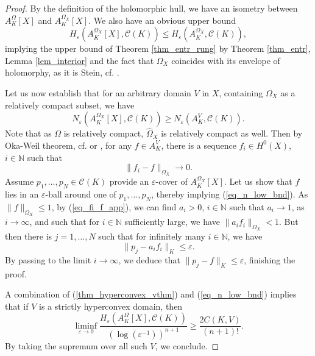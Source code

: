 \documentclass[12pt]{article}
\numberwithin{equation}{section}
\theoremstyle{theorem}
\theoremstyle{definition}
\theoremstyle{remark}
\newcommand{\nat}{\mathbb{N}}
\begin{document}
	\begin{proof}
		By the definition of the holomorphic hull, we have an isometry between $A_K^{\Omega}[X]$ and $A_K^{\Omega_X}[X]$.
		We also have an obvious upper bound
		\begin{equation}
			H_{\varepsilon}(A_K^{\Omega_X}[X], \mathscr{C}(K))
			\leq
			H_{\varepsilon}(A_K^{\Omega_X}, \mathscr{C}(K)),
		\end{equation}
		implying the upper bound of Theorem \ref{thm_entr_rung} by Theorem \ref{thm_entr}, Lemma \ref{lem_interior} and the fact that $\Omega_X$ coincides with its envelope of holomorphy, as it is Stein, cf. \cite[Theorem 5.4.2]{Hormander}.
		\par 
		Let us now establish that for an arbitrary domain $V$ in $X$, containing $\Omega_X$ as a relatively compact subset, we have
		\begin{equation}\label{eq_n_low_bnd}
			N_{\varepsilon}(A_K^{\Omega_X}[X], \mathscr{C}(K))
			\geq
			N_{\varepsilon}(A_K^{V}, \mathscr{C}(K)).
		\end{equation}
		Note that as $\Omega$ is relatively compact, $\widehat{\Omega}_X$ is relatively compact as well.
		Then by Oka-Weil theorem, cf. \cite[Theorem 18]{FornaessMergel} or \cite[Corollary 5.2.9]{Hormander}, for any $f \in A_K^{V}$, there is a sequence $f_i \in H^0(X)$, $i \in \nat$ such that 
		\begin{equation}\label{eq_fi_f_app}
			\| f_i - f \|_{\Omega_X} \to 0.
		\end{equation}
		Assume $p_1, \ldots, p_N \in \mathscr{C}(K)$ provide an $\varepsilon$-cover of $A_K^{\Omega_X}[X]$.
		Let us show that $f$ lies in an $\varepsilon$-ball around one of $p_1, \ldots, p_N$, thereby implying (\ref{eq_n_low_bnd}).
		As $\| f \|_{\Omega_X} \leq 1$, by (\ref{eq_fi_f_app}), we can find $a_i > 0$, $i \in \nat$ such that $a_i \to 1$, as $i \to \infty$, and such that for $i \in \nat$ sufficiently large, we have $\| a_i f_i \|_{\Omega_X} < 1$.
		But then there is $j = 1, \ldots, N$ such that for infinitely many $i \in \nat$, we have
		\begin{equation}
			\| p_j - a_i f_i \|_K \leq \varepsilon.
		\end{equation}
		By passing to the limit $i \to \infty$, we deduce that $\| p_j - f \|_K \leq \varepsilon$, finishing the proof.
		\par 
		A combination of (\ref{thm_hyperconvex_vthm}) and (\ref{eq_n_low_bnd}) implies that if $V$ is a strictly hyperconvex domain, then
		\begin{equation}
			\liminf_{\varepsilon \to 0}
			\frac{H_{\varepsilon}(A_K^{\Omega}[X], \mathscr{C}(K))}{(\log(\varepsilon^{-1}))^{n + 1}}
			\geq
			\frac{2 C(K, V)}{(n + 1)!}.
		\end{equation}
		By taking the supremum over all such $V$, we conclude.
	\end{proof}
	
	
	 
	



		

\Addresses
\end{document}
